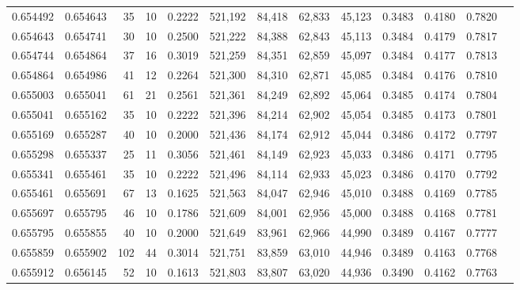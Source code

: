 \begin{tabular}{rrrrrrrrrrrrr}
0.654492 & 0.654643 &    35 &  10 &                                     0.2222 & 521,192 &  84,418 &  62,833 &  45,123 & 0.3483 & 0.4180 & 0.7820 \\
0.654643 & 0.654741 &    30 &  10 &                                     0.2500 & 521,222 &  84,388 &  62,843 &  45,113 & 0.3484 & 0.4179 & 0.7817 \\
0.654744 & 0.654864 &    37 &  16 &                                     0.3019 & 521,259 &  84,351 &  62,859 &  45,097 & 0.3484 & 0.4177 & 0.7813 \\
0.654864 & 0.654986 &    41 &  12 &                                     0.2264 & 521,300 &  84,310 &  62,871 &  45,085 & 0.3484 & 0.4176 & 0.7810 \\
0.655003 & 0.655041 &    61 &  21 &                                     0.2561 & 521,361 &  84,249 &  62,892 &  45,064 & 0.3485 & 0.4174 & 0.7804 \\
0.655041 & 0.655162 &    35 &  10 &                                     0.2222 & 521,396 &  84,214 &  62,902 &  45,054 & 0.3485 & 0.4173 & 0.7801 \\
0.655169 & 0.655287 &    40 &  10 &                                     0.2000 & 521,436 &  84,174 &  62,912 &  45,044 & 0.3486 & 0.4172 & 0.7797 \\
0.655298 & 0.655337 &    25 &  11 &                                     0.3056 & 521,461 &  84,149 &  62,923 &  45,033 & 0.3486 & 0.4171 & 0.7795 \\
0.655341 & 0.655461 &    35 &  10 &                                     0.2222 & 521,496 &  84,114 &  62,933 &  45,023 & 0.3486 & 0.4170 & 0.7792 \\
0.655461 & 0.655691 &    67 &  13 &                                     0.1625 & 521,563 &  84,047 &  62,946 &  45,010 & 0.3488 & 0.4169 & 0.7785 \\
0.655697 & 0.655795 &    46 &  10 &                                     0.1786 & 521,609 &  84,001 &  62,956 &  45,000 & 0.3488 & 0.4168 & 0.7781 \\
0.655795 & 0.655855 &    40 &  10 &                                     0.2000 & 521,649 &  83,961 &  62,966 &  44,990 & 0.3489 & 0.4167 & 0.7777 \\
0.655859 & 0.655902 &   102 &  44 &                                     0.3014 & 521,751 &  83,859 &  63,010 &  44,946 & 0.3489 & 0.4163 & 0.7768 \\
0.655912 & 0.656145 &    52 &  10 &                                     0.1613 & 521,803 &  83,807 &  63,020 &  44,936 & 0.3490 & 0.4162 & 0.7763 \\

\end{tabular}
